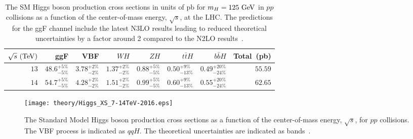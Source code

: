 \begin{table}[htpb]
 \centering
 \caption[The Standard Model Higgs boson production cross sections in units of pb for $m_{H}=125~\GeV$ in $pp$ collisions as a function of the center-of-mass energy, $\sqrt{s}$, at the LHC.]{%
  The SM Higgs boson production cross sections in units of pb for $m_{H}=125~\GeV$ in $pp$ collisions as a function of the center-of-mass energy, $\sqrt{s}$, at the LHC.
  The predictions for the ggF channel include the latest N3LO results leading to reduced theoretical uncertainties by a factor around 2 compared to the N2LO results~\cite{PDG2018:Ch11,deFlorian:2016spz}.}
 \begin{tabular}{@{}rrrrrrrr@{}} \toprule
  $\sqrt{s}~(\mathrm{TeV})$ & ggF                  & VBF                  & $WH$                 & $ZH$                 & $t\bar{t}H$           & $b\bar{b}H$            & Total~(pb) \\ \midrule
  $13$              & $48.6_{-5\%}^{+5\%}$ & $3.78_{-2\%}^{+2\%}$ & $1.37_{-2\%}^{+2\%}$ & $0.88_{-5\%}^{+5\%}$ & $0.50_{-13\%}^{+9\%}$ & $0.49_{-24\%}^{+20\%}$ & $55.59$    \\
  \addlinespace[0.3em]
  $14$              & $54.7_{-5\%}^{+5\%}$ & $4.28_{-2\%}^{+2\%}$ & $1.51_{-2\%}^{+2\%}$ & $0.99_{-5\%}^{+5\%}$ & $0.60_{-13\%}^{+9\%}$ & $0.55_{-24\%}^{+20\%}$ & $62.65$    \\
  \bottomrule
 \end{tabular}\label{table:Higgs_production_cross_section}%
\end{table}

\begin{figure}
 \centering
 \texttt{[image: theory/Higgs\_XS\_7-14TeV-2016.eps]}
 \caption[The Standard Model Higgs boson production cross sections as a function of the center-of-mass energy, $\sqrt{s}$, for $pp$ collisions.]{%
  The Standard Model Higgs boson production cross sections as a function of the center-of-mass energy, $\sqrt{s}$, for $pp$ collisions.
  The VBF process is indicated as $qqH$.
  The theoretical uncertainties are indicated as bands~\cite{PDG2018:Ch11}.}
 \label{fig:Higgs_production_cross_section_theory}
\end{figure}

